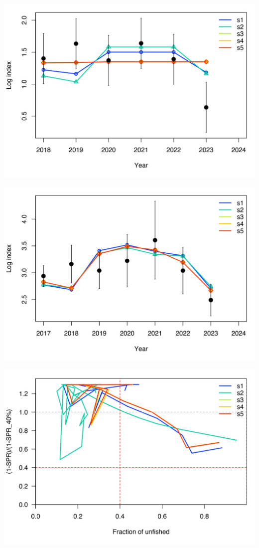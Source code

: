 \documentclass[
]{article}
\begin{document}
\begin{center}\includegraphics{Dtrunculus_SS3_2024_files/figure-latex/unnamed-chunk-17-14} \end{center}

\begin{center}\includegraphics{Dtrunculus_SS3_2024_files/figure-latex/unnamed-chunk-17-15} \end{center}

\begin{center}\includegraphics{Dtrunculus_SS3_2024_files/figure-latex/unnamed-chunk-17-16} \end{center}
\end{document}
